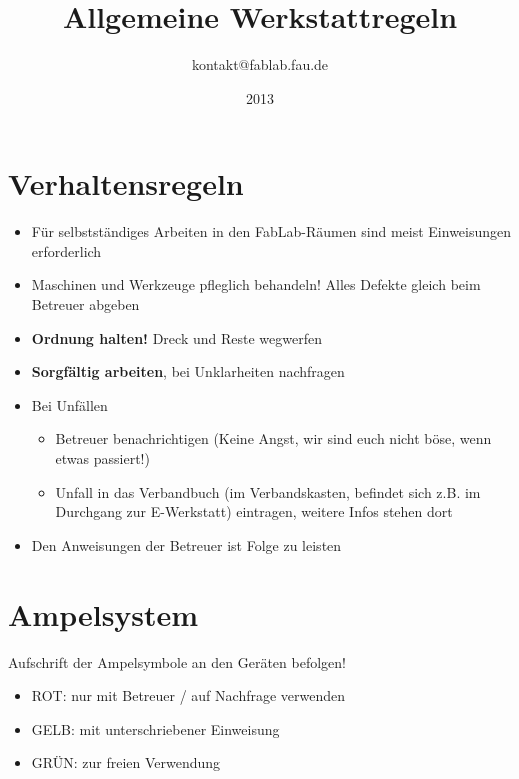 \documentclass[13pt]{\basedir/fablab-document}
\date{2013}
\author{kontakt@fablab.fau.de}
\title{Allgemeine Werkstattregeln}
\begin{document}
\maketitle

\vbox{\vspace{1cm}}


\section{Verhaltensregeln}
\begin{itemize}
  \item Für selbstständiges Arbeiten in den FabLab-Räumen sind meist Einweisungen erforderlich
  \item Maschinen und Werkzeuge pfleglich behandeln! Alles Defekte gleich beim Betreuer abgeben
  \item \textbf{Ordnung halten!} Dreck und Reste wegwerfen
  \item \textbf{Sorgfältig arbeiten}, bei Unklarheiten nachfragen
  \item Bei Unfällen
  \begin{itemize}
  	\item Betreuer benachrichtigen (Keine Angst, wir sind euch nicht böse, wenn etwas passiert!)
  	\item Unfall in das Verbandbuch (im Verbandskasten, befindet sich z.B. im Durchgang zur E-Werkstatt) eintragen, weitere Infos stehen dort
  \end{itemize} 
  \item Den Anweisungen der Betreuer ist Folge zu leisten
\end{itemize}
\vbox{\vspace{0,5cm}}

\section{Ampelsystem}
Aufschrift der Ampelsymbole an den Geräten befolgen!
\begin{itemize}
 \item ROT: nur mit Betreuer / auf Nachfrage verwenden
 \item GELB: mit unterschriebener Einweisung
 \item GRÜN: zur freien Verwendung
\end{itemize}
\end{document}
